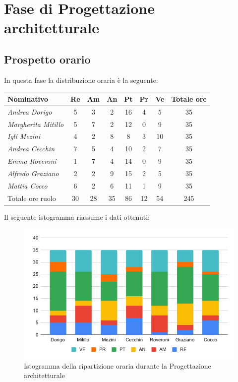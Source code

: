 {{{{\section{Fase di Progettazione architetturale}\label{PreventivoFaseDiProgettazioneArchitetturale}

\subsection{Prospetto orario}\label{PreventivoFaseDiProgettazioneArchitetturaleProspettoOrario}
In questa fase la distribuzione oraria è la seguente:
\quad
\def\tabularxcolumn#1{m{#1}}
{

	\begin{center}
		\renewcommand{\arraystretch}{1.4}
		\begin{tabularx}{\textwidth}{|X|c|c|c|c|c|c|c|}
			\hline
			\rowcolor{airforceblue}
			\textbf{Nominativo} & \textbf{Re} & \textbf{Am} & \textbf{An} & \textbf{Pt} & \textbf{Pr} & \textbf{Ve} & \textbf{Totale ore}\\
			\hline
			\textit{Andrea Dorigo} & 5 & 3 & 2 & 16 & 4 & 5 & 35\\
			\hline
			\textit{Margherita Mitillo} & 5 & 7 & 2 & 12 & 0 & 9 & 35\\
			\hline
			\textit{Igli Mezini} & 4 & 2 & 8 & 8 & 3 & 10 & 35\\
			\hline
			\textit{Andrea Cecchin} & 7 & 5 & 4 & 10 & 2 & 7 & 35\\
			\hline
			\textit{Emma Roveroni} & 1 & 7 & 4 & 14 & 0 & 9 & 35\\
			\hline
			\textit{Alfredo Graziano} & 2 & 2 & 9 & 15 & 2 & 5 & 35\\
			\hline
			\textit{Mattia Cocco} & 6 & 2 & 6 & 11 & 1 & 9 & 35\\
			\hline
			Totale ore ruolo & 30 & 28 & 35 & 86 & 12 & 54 & 245\\
			\hline
		\end{tabularx}
	\end{center}

Il seguente istogramma riassume i dati ottenuti:
\begin{figure}[!h]
	\begin{center}
		\includegraphics[width=0.7\linewidth]{../immagini/pdp/istogramma_progettazione_architetturale.png}
		\caption{Istogramma della ripartizione oraria durante la Progettazione architetturale}
	\end{center}
\end{figure}

}}}}}
